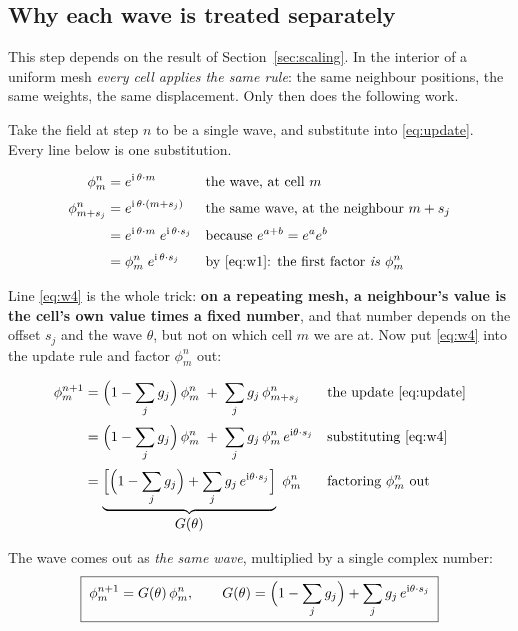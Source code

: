 \documentclass[11pt,a4paper]{article}
\begin{document}
\subsection{Why each wave is treated separately}

This step depends on the result of Section~\ref{sec:scaling}. In the interior of a uniform mesh
\emph{every cell applies the same rule}: the same neighbour positions, the same weights, the
same displacement. Only then does the following work.

Take the field at step \(n\) to be a single wave, and substitute into \eqref{eq:update}. Every
line below is one substitution.

\begin{align}
  \phi^n_m &= e^{\mathrm{i}\,\theta\cdot m}
    &&\text{the wave, at cell } m \label{eq:w1}\\[2pt]
  \phi^n_{m+s_j} &= e^{\mathrm{i}\,\theta\cdot (m+s_j)}
    &&\text{the same wave, at the neighbour } m+s_j \label{eq:w2}\\[2pt]
  &= e^{\mathrm{i}\,\theta\cdot m}\;e^{\mathrm{i}\,\theta\cdot s_j}
    &&\text{because } e^{a+b} = e^{a}e^{b} \label{eq:w3}\\[2pt]
  &= \phi^n_m\;e^{\mathrm{i}\,\theta\cdot s_j}
    &&\text{by \eqref{eq:w1}: the first factor \emph{is} } \phi^n_m \label{eq:w4}
\end{align}

Line \eqref{eq:w4} is the whole trick: \textbf{on a repeating mesh, a neighbour's value is the
cell's own value times a fixed number}, and that number depends on the offset \(s_j\) and the
wave \(\theta\), but not on which cell \(m\) we are at. Now put \eqref{eq:w4} into the update
rule and factor \(\phi^n_m\) out:

\begin{align}
  \phi^{n+1}_m
    &= \Bigl(1 - \sum_j g_j\Bigr)\,\phi^n_m \;+\; \sum_j g_j\,\phi^n_{m+s_j}
    &&\text{the update \eqref{eq:update}} \\[2pt]
    &= \Bigl(1 - \sum_j g_j\Bigr)\,\phi^n_m \;+\; \sum_j g_j\,\phi^n_m\,e^{\mathrm{i}\theta\cdot s_j}
    &&\text{substituting \eqref{eq:w4}} \\[2pt]
    &= \underbrace{\Bigl[\Bigl(1 - \sum_j g_j\Bigr) + \sum_j g_j\,e^{\mathrm{i}\theta\cdot s_j}\Bigr]}_{\textstyle G(\theta)}\;\phi^n_m
    &&\text{factoring } \phi^n_m \text{ out}
\end{align}

The wave comes out as \emph{the same wave}, multiplied by a single complex number:
\begin{equation}
  \boxed{\;\phi^{n+1}_m = G(\theta)\,\phi^{n}_m, \qquad
  G(\theta) = \Bigl(1-\sum_j g_j\Bigr) + \sum_j g_j\, e^{\mathrm{i}\theta\cdot s_j} \;}
  \label{eq:symbol}
\end{equation}
\end{document}
